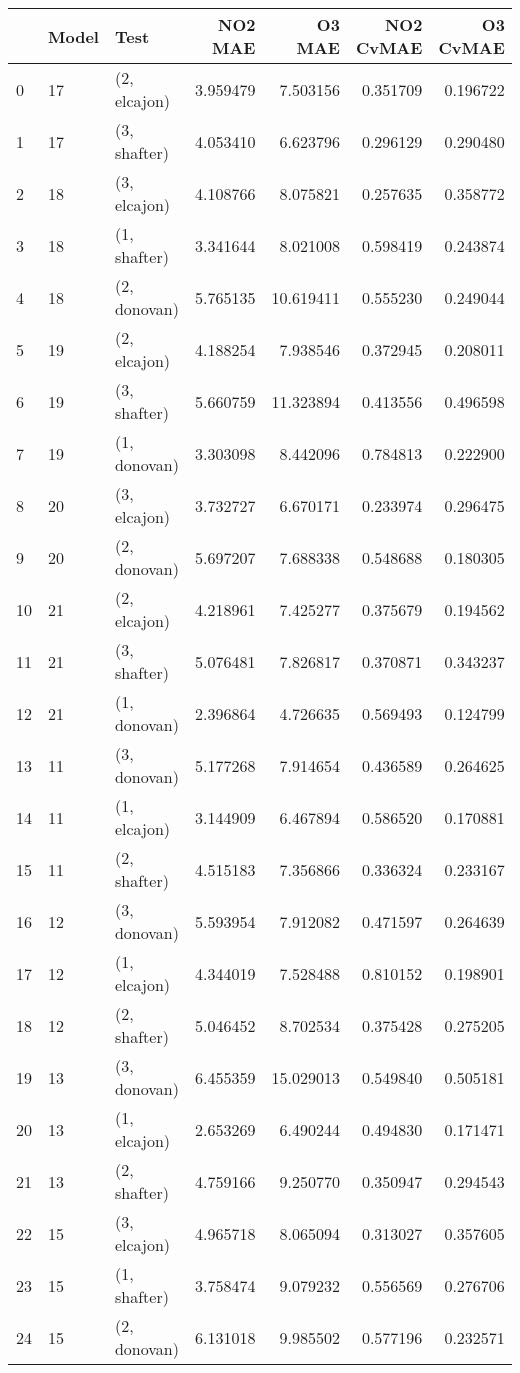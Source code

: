 \begin{tabular}{lllrrrr}
\toprule
{} & Model &          Test &   NO2 MAE &     O3 MAE &  NO2 CvMAE &  O3 CvMAE \\
\midrule
0  &    17 &  (2, elcajon) &  3.959479 &   7.503156 &   0.351709 &  0.196722 \\
1  &    17 &  (3, shafter) &  4.053410 &   6.623796 &   0.296129 &  0.290480 \\
2  &    18 &  (3, elcajon) &  4.108766 &   8.075821 &   0.257635 &  0.358772 \\
3  &    18 &  (1, shafter) &  3.341644 &   8.021008 &   0.598419 &  0.243874 \\
4  &    18 &  (2, donovan) &  5.765135 &  10.619411 &   0.555230 &  0.249044 \\
5  &    19 &  (2, elcajon) &  4.188254 &   7.938546 &   0.372945 &  0.208011 \\
6  &    19 &  (3, shafter) &  5.660759 &  11.323894 &   0.413556 &  0.496598 \\
7  &    19 &  (1, donovan) &  3.303098 &   8.442096 &   0.784813 &  0.222900 \\
8  &    20 &  (3, elcajon) &  3.732727 &   6.670171 &   0.233974 &  0.296475 \\
9  &    20 &  (2, donovan) &  5.697207 &   7.688338 &   0.548688 &  0.180305 \\
10 &    21 &  (2, elcajon) &  4.218961 &   7.425277 &   0.375679 &  0.194562 \\
11 &    21 &  (3, shafter) &  5.076481 &   7.826817 &   0.370871 &  0.343237 \\
12 &    21 &  (1, donovan) &  2.396864 &   4.726635 &   0.569493 &  0.124799 \\
13 &    11 &  (3, donovan) &  5.177268 &   7.914654 &   0.436589 &  0.264625 \\
14 &    11 &  (1, elcajon) &  3.144909 &   6.467894 &   0.586520 &  0.170881 \\
15 &    11 &  (2, shafter) &  4.515183 &   7.356866 &   0.336324 &  0.233167 \\
16 &    12 &  (3, donovan) &  5.593954 &   7.912082 &   0.471597 &  0.264639 \\
17 &    12 &  (1, elcajon) &  4.344019 &   7.528488 &   0.810152 &  0.198901 \\
18 &    12 &  (2, shafter) &  5.046452 &   8.702534 &   0.375428 &  0.275205 \\
19 &    13 &  (3, donovan) &  6.455359 &  15.029013 &   0.549840 &  0.505181 \\
20 &    13 &  (1, elcajon) &  2.653269 &   6.490244 &   0.494830 &  0.171471 \\
21 &    13 &  (2, shafter) &  4.759166 &   9.250770 &   0.350947 &  0.294543 \\
22 &    15 &  (3, elcajon) &  4.965718 &   8.065094 &   0.313027 &  0.357605 \\
23 &    15 &  (1, shafter) &  3.758474 &   9.079232 &   0.556569 &  0.276706 \\
24 &    15 &  (2, donovan) &  6.131018 &   9.985502 &   0.577196 &  0.232571 \\
\bottomrule
\end{tabular}
